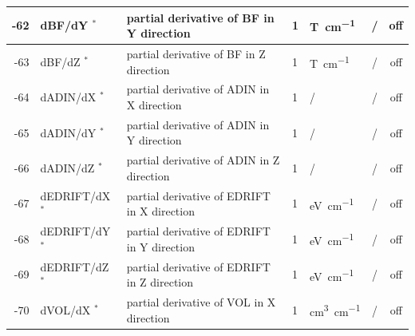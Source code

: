 \begin{landscape}
\begin{longtable}{|r|l|l|l|l|c|c|}
    -62                    & dBF/dY $^*$
                           & partial derivative of BF in Y direction  
                           & 1                            & \si{\tesla\per\centi\metre} 
			   & /              & off         
    \\ \hline
    -63                    & dBF/dZ $^*$
                           & partial derivative of BF in Z direction  
                           & 1                            & \si{\tesla\per\centi\metre}
			   & /              & off         
    \\ \hline
    -64                    & dADIN/dX $^*$
                           & partial derivative of ADIN in X direction
                           & 1                            & /
			   & /              & off         
    \\ \hline
    -65                    & dADIN/dY $^*$
                           & partial derivative of ADIN in Y direction
                           & 1                            & /
			   & /              & off         
    \\ \hline
    -66                    & dADIN/dZ $^*$
                           & partial derivative of ADIN in Z direction
                           & 1                            & /
			   & /              & off         
    \\ \hline
    -67                    & dEDRIFT/dX $^*$
                           & partial derivative of EDRIFT in X direction
                           & 1                            & \si{\electronvolt\per\centi\meter}
			   & /              & off         
    \\ \hline
    -68                    & dEDRIFT/dY $^*$
                           & partial derivative of EDRIFT in Y direction
                           & 1                            & \si{\electronvolt\per\centi\meter}
			   & /              & off         
    \\ \hline
    -69                    & dEDRIFT/dZ $^*$
                           & partial derivative of EDRIFT in Z direction
                           & 1                            & \si{\electronvolt\per\centi\meter}
			   & /              & off         
    \\ \hline
    -70                    & dVOL/dX $^*$
                           & partial derivative of VOL in X direction
                           & 1                            & \si{\cubic\centi\metre\per\centi\metre}
			   & /              & off         
    \\ \hline

\end{longtable}
\end{landscape}
